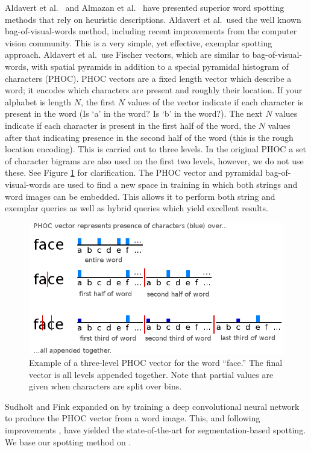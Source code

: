 \documentclass[ms,electronic,twosidetoc,letterpaper,chaptercenter,parttop,lof,lot]{byumsphd}
\begin{document}
Aldavert et al.~\cite{Aldavert2015} and Almazan et al.~\cite{Almazan2014} have presented superior word spotting methods that rely on heuristic descriptions. Aldavert et al.~used the well known bag-of-visual-words method, including recent improvements from the computer vision community. This is a very simple, yet effective, exemplar spotting approach. Aldavert et al.~use Fischer vectors, which are similar to bag-of-visual-words, with spatial pyramids in addition to a special pyramidal histogram of characters (PHOC).
PHOC vectors are a fixed length vector which describe a word; it encodes which characters are present and roughly their location. If your alphabet is length $N$, the first $N$ values of the vector indicate if each character is present in the word (Is `a' in the word? Is `b' in the word?). The next $N$ values indicate if each character is present in the first half of the word, the $N$ values after that indicating presence in the second half of the word (this is the rough location encoding). This is carried out to three levels. In the original PHOC a set of character bigrams are also used on the first two levels, however, we do not use these. See Figure \ref{fig:phoc} for clarification.
The PHOC vector and pyramidal bag-of-visual-words are used to find a new space in training in which both strings and word images can be embedded. This allows it to perform both string and exemplar queries as well as hybrid queries which yield excellent results.

\begin{figure}[t]
    \centering
    \includegraphics[width=.65\textwidth]{phoc}
    \caption{Example of a three-level PHOC vector for the word ``face.'' The final vector is all levels appended together. Note that partial values are given when characters are split over bins.}
    \label{fig:phoc}
\end{figure}

Sudholt and Fink \cite{sudholt2016,sudholt2017} expanded on \cite{Almazan2014} by training a deep convolutional neural network to produce the PHOC vector from a word image. This, and following improvements \cite{krishnan2016, retsinasTrans2017}, have yielded the state-of-the-art for segmentation-based spotting. We base our spotting method on \cite{sudholt2017}.
\end{document}
